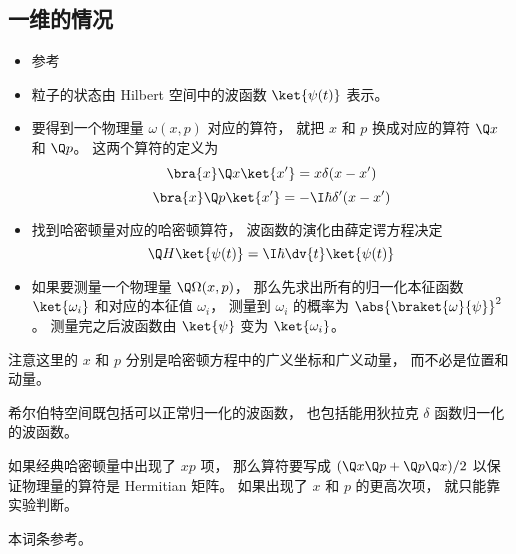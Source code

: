 
\begin{issues}
\issueDraft
\end{issues}



\subsection{一维的情况}
\begin{itemize}
\item 参考 \cite{Shankar}
\item 粒子的状态由 Hilbert 空间中的波函数 $\ket{\psi(t)}$ 表示。
\item 要得到一个物理量 $\omega(x, p)$ 对应的算符， 就把 $x$ 和 $p$ 换成对应的算符 $\Q x$ 和 $\Q p$。 这两个算符的定义为
\begin{equation}
\bra{x}\Q x \ket{x'} = x\delta(x-x')
\end{equation}
\begin{equation}
\bra{x}\Q p \ket{x'} = -\I\hbar \delta'(x-x')
\end{equation}
\item 找到哈密顿量对应的哈密顿算符， 波函数的演化由薛定谔方程决定
\begin{equation}
\Q H \ket{\psi(t)} = \I \hbar \dv{t} \ket{\psi(t)}
\end{equation}
\item 如果要测量一个物理量 $\Q\Omega(x, p)$， 那么先求出所有的归一化本征函数 $\ket{\omega_i}$ 和对应的本征值 $\omega_i$， 测量到 $\omega_i$ 的概率为 $\abs{\braket{\omega}{\psi}}^2$。 测量完之后波函数由 $\ket{\psi}$ 变为 $\ket{\omega_i}$。
\end{itemize}

注意这里的 $x$ 和 $p$ 分别是哈密顿方程中的广义坐标和广义动量， 而不必是位置和动量。

希尔伯特空间既包括可以正常归一化的波函数， 也包括能用狄拉克 $\delta$ 函数归一化的波函数。

如果经典哈密顿量中出现了 $xp$ 项， 那么算符要写成 $(\Q x \Q p + \Q p \Q x)/2$ 以保证物理量的算符是 Hermitian 矩阵。 如果出现了 $x$ 和 $p$ 的更高次项， 就只能靠实验判断。

本词条参考\cite{Shankar}。

